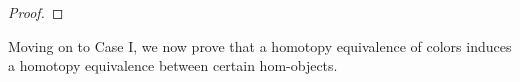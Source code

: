 \documentclass[a4paper,10pt
,draft
]{article}%
\newcommand{\J}{\mathbb J}
\renewcommand{\1}{\eta}%
\begin{document}
\begin{proof}
\end{proof}

Moving on to Case I, we now prove that a homotopy equivalence of colors induces a homotopy equivalence between certain hom-objects.
\end{document}
